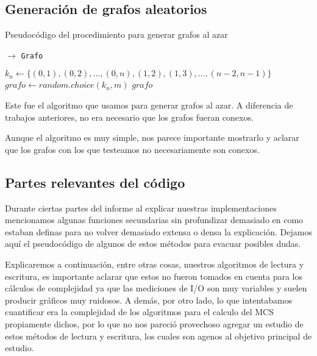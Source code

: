 
\subsection{Generación de grafos aleatorios}
\label{subsec:grafos-aleatorios}

\begin{algorithm}[H]
  \begin{algorithmic}[1]
  \caption{Pseudocódigo del procedimiento para generar grafos al azar}
  \label{algo:ap-1}
    $\rightarrow$ \texttt{Grafo}

    	\State $k_n \gets \{(0,1), (0,2), ..., (0,n), (1,2), (1,3), ..., (n-2, n-1)\}$
      \State $grafo \gets random.choice(k_n, m)$
      \Return $grafo$
		\EndProcedure
	\end{algorithmic}
\end{algorithm}


Este fue el algoritmo que usamos para generar grafos al azar. A diferencia de trabajos anteriores, no era necesario que los grafos fueran conexos.

Aunque el algoritmo es muy simple, nos parece importante mostrarlo y aclarar que los grafos con los que testeamos no necesariamente son conexos.



\newpage
\subsection{Partes relevantes del código}
\lstset{language=C++, breaklines=true, basicstyle=\footnotesize}
\lstset{numbers=left, numberstyle=\tiny, stepnumber=1, numbersep=5pt, tabsize=2}

Durante ciertas partes del informe al explicar nuestras implementaciones mencionamos algunas funciones secundarias sin profundizar demasiado en como estaban definas para no volver demasiado extensa o densa la explicación. Dejamos aquí el pseudocódigo de algunos de estos métodos para evacuar posibles dudas.

Explicaremos a continuación, entre otras cosas, nuestros algoritmos de lectura y escritura, es importante aclarar que estos no fueron tomados en cuenta para los cálculos de complejidad ya que las mediciones de I/O son muy variables y suelen producir gráficos muy ruidosos. A demás, por otro lado, lo que intentabamos cuantificar era la complejidad de los algoritmos para el calculo del MCS propiamente dichos, por lo que no nos pareció provechoso agregar un estudio de estos métodos de lectura y escritura, los cuales son agenos al objetivo principal de estudio.

